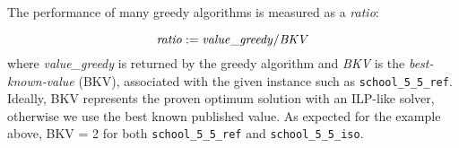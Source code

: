 %
%  
%
%
%

%
\par\noindent
The performance of  many greedy algorithms is measured as
a {\it ratio}:
\par\vspace*{-2ex}
\begin{equation}   \label{eq_ratio}
  {\it  ratio} := {\it  value\_greedy} / {\it  BKV}
\end{equation}
where {\it value\_greedy} is returned by the greedy algorithm 
and {\it BKV} is the {\it best-known-value} (BKV),
associated with the given instance such as 
{\tt school\_5\_5\_ref}.
Ideally, BKV represents the
proven optimum solution with an ILP-like solver,
otherwise we use the best known published value. 
As expected for the  example above,
BKV = 2 for both {\tt school\_5\_5\_ref} and {\tt school\_5\_5\_iso}.

